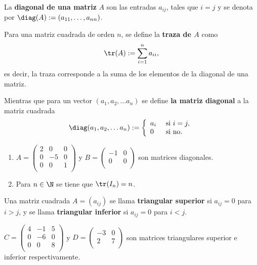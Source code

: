 \begin{defin}
La \textbf{diagonal de una matriz} $A$ son las entradas $a_{i j}$, tales que $i=j$ y se denota por $\diag(A):=(a_{11}, \dots, a_{nn})$.

Para una matriz cuadrada de orden $n$, se define la \textbf{traza de $A$} como
\[\tr(A):=\sum_{i=1}^{n} a_{ii},\]
es decir, la traza corresponde a la suma de los elementos de la diagonal de una matriz.

Mientras que para un vector $(a_{1} ,a_{2} ,  \dots  a_{n})$ se define \textbf{la matriz diagonal} a la matriz cuadrada
\[\diag(a_{1} ,a_{2} ,  \dots  a_{n}):=\left\{\begin{array}{ll}
    a_i & \text{ si } i=j,\\
    0 & \text{ si no.}
\end{array}\right.\]
\end{defin}


\begin{ejem}
\begin{enumerate}
    \item     $A=\begin{pmatrix}
    2 & 0 & 0\\
    0 & -5 & 0\\
    0 & 0 & 1\\
    \end{pmatrix}
    $ y $B=\begin{pmatrix}
    -1 & 0 \\
    0 & 0 \\
    \end{pmatrix}$ son matrices diagonales.
    \item Para $n\in \N$ se tiene que $\tr(I_n)=n$.
\end{enumerate}

\end{ejem}


\begin{defin}
Una matriz cuadrada $A = (a_{i j})$ se llama \textbf{triangular
superior} si $a_{i j} = 0$ para $i > j$, y se llama \textbf{triangular inferior}
si $a_{i j} = 0$ para $i < j$.

\end{defin}

\begin{ejem}
    $C=\begin{pmatrix}
    4 & -1 & 5\\
    0 & -6 & 0\\
    0 & 0 & 8\\
    \end{pmatrix}
    $ y $D=\begin{pmatrix}
    -3 & 0 \\
    2 & 7 \\
    \end{pmatrix}$ son matrices triangulares superior e inferior respectivamente.
\end{ejem}

